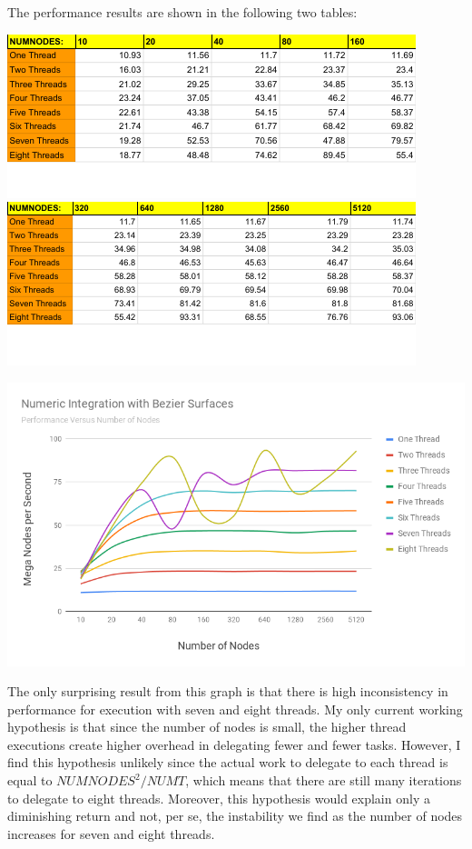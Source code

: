 \documentclass[11pt,letterpaper]{article}
\begin{document}
\begin{enumerate}
    The performance results are shown in the following two tables:

    \includegraphics[width=\linewidth]{results2}
    \includegraphics[width=\linewidth]{results3}

    \includegraphics[width=\linewidth]{versusNodes}

    The only surprising result from this graph is that 
    there is high inconsistency in performance for execution with seven and 
    eight threads. My only current working hypothesis
    is that since the number of nodes is small, the higher thread executions
    create higher overhead in delegating fewer and fewer tasks. 
    However, I find this hypothesis unlikely since the actual
    work to delegate to each thread is equal to $NUMNODES^2 / NUMT$, which
    means that there are still many iterations to delegate to eight threads.
    Moreover, this hypothesis would explain only a diminishing return 
    and not, per se, the instability we find as the number of nodes increases
    for seven and eight threads. 


\end{enumerate}
\end{document}
